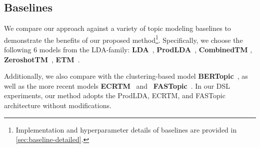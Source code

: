 \documentclass{article}
\theoremstyle{plain}
\theoremstyle{definition}
\theoremstyle{remark}
\begin{document}





\subsection{Baselines}
We compare our approach against a variety of topic modeling baselines to demonstrate the benefits of our proposed method\footnote{Implementation and hyperparameter details of baselines are provided in \autoref{sec:baseline-detailed}.}. Specifically, we choose the following $6$ models from the LDA-family: 
\textbf{LDA}~\citep{blei2003latent}, 
\textbf{ProdLDA}~\citep{srivastava2017autoencoding}, 
\textbf{CombinedTM} \citep{bianchi-etal-2021-pre}, 
\textbf{ZeroshotTM}~\citep{bianchi-etal-2021-pre}, \textbf{ETM}~\citep{dieng-etal-2020-topic}.

Additionally, 
we also compare with the clustering-based model \textbf{BERTopic}~\citep{grootendorst2022bertopic}, as well as the more recent models \textbf{ECRTM}~\citep{wu2023effective} and ~\textbf{FASTopic}~\citep{wu2024fastopic}.
In our DSL experiments, our method adopts the ProdLDA, ECRTM, and FASTopic architecture without modifications.
\end{document}
